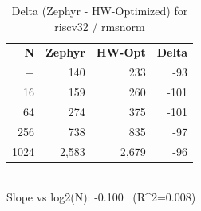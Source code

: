 \begin{table}[tb]
    \centering
    \caption{Delta (Zephyr - HW-Optimized) for riscv32 / rmsnorm}
    \label{tab:delta_riscv32_rmsnorm}
    \scriptsize
    \begin{tabular}{r r r r}
        \hline
        \textbf{N} & \textbf{Zephyr} & \textbf{HW-Opt} & \textbf{Delta} \\\n+        \hline
        4 & 140 & 233 & -93\\
        16 & 159 & 260 & -101\\
        64 & 274 & 375 & -101\\
        256 & 738 & 835 & -97\\
        1024 & 2,583 & 2,679 & -96\\
        \hline
    \end{tabular}
    \vspace{2mm}\\\n    Slope vs log2(N): -0.100 \ (R^2=0.008)\n\end{table}

